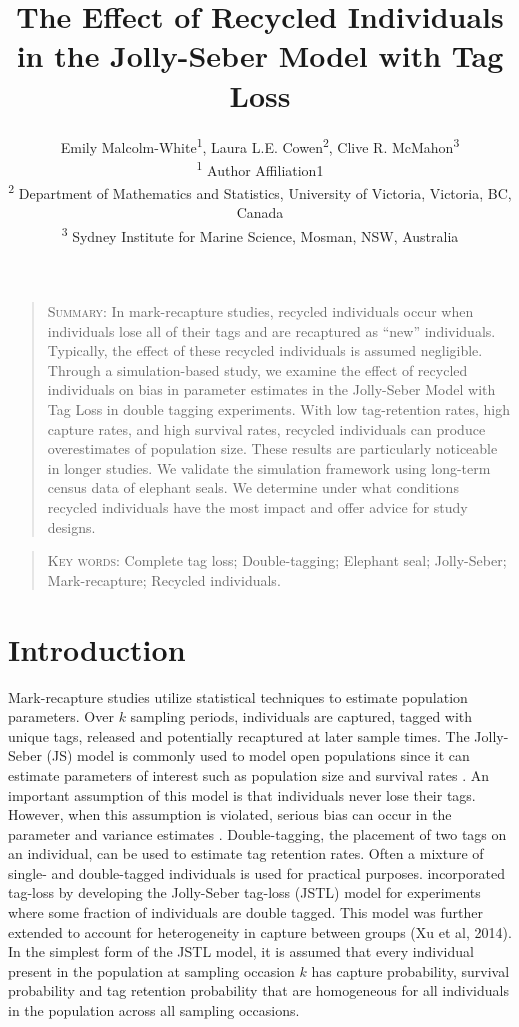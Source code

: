 \documentclass[]{article}
\title{The Effect of Recycled Individuals in the Jolly-Seber Model with Tag
Loss}
\author{Emily Malcolm-White\textsuperscript{1},
        Laura L.E. Cowen\textsuperscript{2}, 
        Clive R. McMahon\textsuperscript{3}\\ 
        \textsuperscript{1} Author Affiliation1\\ 
        \textsuperscript{2} Department of Mathematics and Statistics, University of Victoria, Victoria, BC, Canada\\
        \textsuperscript{3} Sydney Institute for Marine Science, Mosman, NSW, Australia}
\begin{document}
\maketitle


\begin{quote}
\textsc{Summary:} In mark-recapture studies, recycled individuals occur
when individuals lose all of their tags and are recaptured as ``new''
individuals. Typically, the effect of these recycled individuals is
assumed negligible. Through a simulation-based study, we examine the
effect of recycled individuals on bias in parameter estimates in the
Jolly-Seber Model with Tag Loss \citep{Cowen:2006} in double tagging experiments. With low tag-retention
rates, high capture rates, and high survival rates, recycled individuals
can produce overestimates of population size. These results are
particularly noticeable in longer studies. We validate the simulation
framework using long-term census data of elephant seals. We
determine under what conditions recycled individuals have the most
impact and offer advice for study designs.
\end{quote}

\begin{quote}
\begin{center} \textsc{Key words:} Complete tag loss; Double-tagging; Elephant seal; Jolly-Seber; Mark-recapture;   Recycled individuals. 
\end{center}
\end{quote}

\section{Introduction}\label{introduction}

Mark-recapture studies utilize statistical techniques to estimate
population parameters. Over \(k\) sampling
periods, individuals are captured, tagged with unique tags, released and potentially
recaptured at later sample times. The Jolly-Seber (JS) model \citep{Jolly:1965, Seber:1965}
 is commonly used to model open populations since it
can estimate parameters of interest such as population size and survival
rates \citep{Pollock:1990}. An important assumption of this model is that 
individuals never lose their tags. However, when this assumption is
violated, serious bias can occur in the parameter and variance estimates
\citep{Arnason:1981}. Double-tagging, the placement of two tags on
an individual, can be used to estimate tag retention rates. Often a
mixture of single- and double-tagged individuals is used for practical
purposes. \cite{Cowen:2006} incorporated tag-loss by developing
the Jolly-Seber tag-loss (JSTL) model for experiments where some
fraction of individuals are double tagged. This model was further
extended to account for heterogeneity in capture between groups (Xu et
al, 2014). In the simplest form of the JSTL model, it is assumed that
every individual present in the population at sampling occasion \(k\)
has capture probability, survival probability and tag retention
probability that are homogeneous for all individuals in the population
across all sampling occasions.
\end{document}
